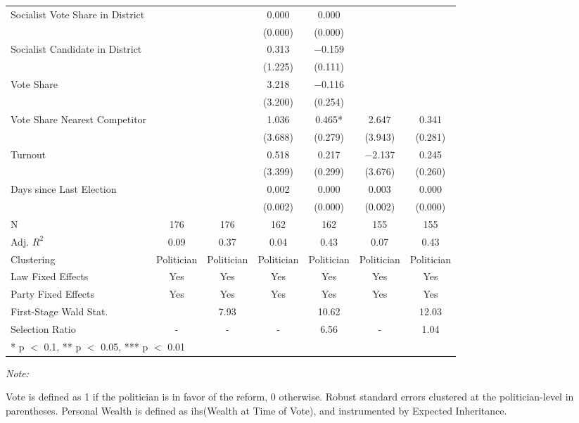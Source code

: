 \begin{table}[!h]
{\begin{threeparttable}
\begin{tabular}[t]{lcccccc}
Socialist Vote Share in District &  &  & \num{0.000} & \num{0.000} &  & \\
 &  &  & (\num{0.000}) & (\num{0.000}) &  & \\
Socialist Candidate in District &  &  & \num{0.313} & \num{-0.159} &  & \\
 &  &  & (\num{1.225}) & (\num{0.111}) &  & \\
Vote Share &  &  & \num{3.218} & \num{-0.116} &  & \\
 &  &  & (\num{3.200}) & (\num{0.254}) &  & \\
Vote Share Nearest Competitor &  &  & \num{1.036} & \num{0.465}* & \num{2.647} & \num{0.341}\\
 &  &  & (\num{3.688}) & (\num{0.279}) & (\num{3.943}) & (\num{0.281})\\
Turnout &  &  & \num{0.518} & \num{0.217} & \num{-2.137} & \num{0.245}\\
 &  &  & (\num{3.399}) & (\num{0.299}) & (\num{3.676}) & (\num{0.260})\\
Days since Last Election &  &  & \num{0.002} & \num{0.000} & \num{0.003} & \num{0.000}\\
 &  &  & (\num{0.002}) & (\num{0.000}) & (\num{0.002}) & (\num{0.000})\\
\midrule
N & \num{176} & \num{176} & \num{162} & \num{162} & \num{155} & \num{155}\\
Adj. $R^2$ & \num{0.09} & \num{0.37} & \num{0.04} & \num{0.43} & \num{0.07} & \num{0.43}\\
Clustering & Politician & Politician & Politician & Politician & Politician & Politician\\
Law Fixed Effects & Yes & Yes & Yes & Yes & Yes & Yes\\
Party Fixed Effects & Yes & Yes & Yes & Yes & Yes & Yes\\
First-Stage Wald Stat. &  & 7.93 &  & 10.62 &  & 12.03\\
Selection Ratio & - & - & - & 6.56 & - & 1.04\\
\bottomrule
\multicolumn{7}{l}{\rule{0pt}{1em}* p $<$ 0.1, ** p $<$ 0.05, *** p $<$ 0.01}\\
\end{tabular}
\begin{tablenotes}[para]
\item \textit{Note: } 
\item Vote is defined as 1 if the politician is in favor of the reform, 0 otherwise. Robust standard errors clustered at the politician-level in parentheses. Personal Wealth is defined as ihs(Wealth at Time of Vote), and instrumented by Expected Inheritance.
\end{tablenotes}
\end{threeparttable}}
\end{table}
